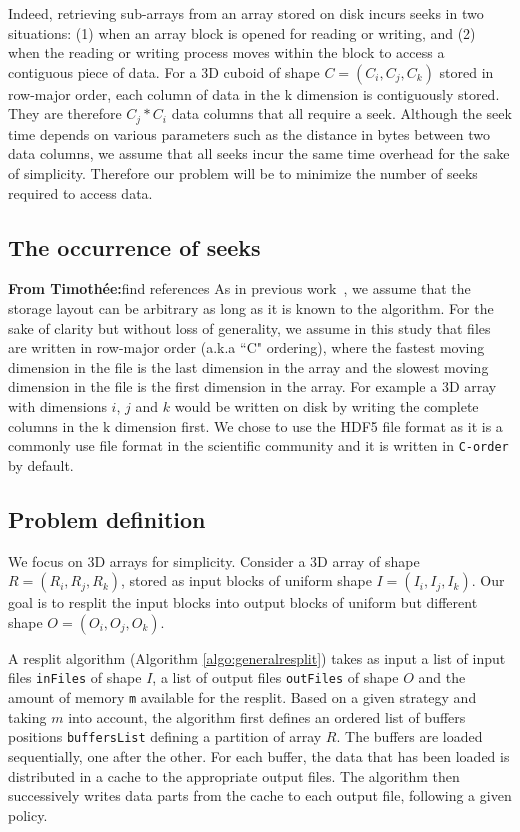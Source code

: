 \documentclass[conference]{IEEEtran}
\newcommand{\timothee}[1]{\color{blue}\textbf{From Timothée:}#1\color{black}}
\begin{document}
Indeed, retrieving sub-arrays from an array stored on disk incurs seeks in two situations: (1) when an array block
is opened for reading or writing, and (2) when the reading or writing process
moves within the block to access a contiguous piece of data. For a 3D cuboid of shape $C = (C_i, C_j, C_k)$
 stored in row-major order,
each column of data in the k dimension is contiguously stored. They are therefore
$C_j * C_i$ data columns that all require a seek. Although the seek
time depends on various parameters such as the distance in bytes between two
data columns, we assume that all seeks incur the same time overhead for the sake
of simplicity. Therefore our problem will be to minimize the number of seeks
required to access data.

\subsection{The occurrence of seeks}
\timothee{find references}
As in previous work~\cite{seqalgorithms}, we assume that the storage layout can
be arbitrary as long as it is known to the algorithm.
For the sake of clarity but without loss of generality,
 we assume in this study that files are written in row-major order (a.k.a
``C" ordering), where the fastest moving dimension in the file is the last
dimension in the array and the slowest moving dimension in the file is the first
dimension in the array. For example a 3D array with dimensions $i$, $j$ and $k$
would be written on disk by writing the complete columns in the k dimension first.
We chose to use the HDF5 file format as it is a commonly use file format in the
scientific community and it is written in \texttt{C-order} by default.

\subsection{Problem definition}
We focus on 3D arrays for simplicity. Consider a 3D array of shape $R =
(R_i, R_j, R_k)$, stored as input blocks of uniform shape $I =
(I_i, I_j, I_k)$. Our goal is to resplit the input blocks into output
blocks of uniform but different shape $O = (O_i, O_j, O_k)$.

A resplit algorithm (Algorithm \ref{algo:generalresplit}) takes as input a
list of input files \texttt{inFiles} of shape $I$, a list of output
files \texttt{outFiles} of shape $O$ and the amount of memory
\texttt{m} available for the resplit. Based on a given strategy and taking $m$ into account, the
algorithm first defines an ordered list of buffers positions \texttt{buffersList}
defining a partition of array $R$. The buffers are loaded sequentially, one after the other. For
each buffer, the data that has been loaded is distributed in a cache to the appropriate output files.
The algorithm then successively writes data parts from the cache to each output file, following a given policy.
\end{document}

